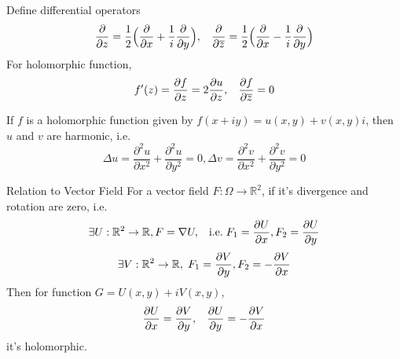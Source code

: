 \documentclass{beamer}
\begin{document}
\begin{frame}
\begin{block}{}
Define differential operators
$$\dfrac{\partial }{\partial z}=\dfrac{1}{2}\Big(\dfrac{\partial }{\partial x}+\dfrac{1}{i}\dfrac{\partial }{\partial y}\Big),\hspace{3mm}\dfrac{\partial }{\partial \overline{z}}=\dfrac{1}{2}\Big(\dfrac{\partial }{\partial x}-\dfrac{1}{i}\dfrac{\partial }{\partial y}\Big)$$
For holomorphic function,
$$f'(z)=\dfrac{\partial f}{\partial z}=2\dfrac{\partial u}{\partial z},\hspace{3mm} \dfrac{\partial f}{\partial \overline{z}}=0$$

If $f$ is a holomorphic function given by $f(x + iy) = u(x, y) + v(x,y)i$, then $u$ and $v$ are harmonic, i.e.
$$\Delta u=\dfrac{\partial^2u}{\partial x^2}+\dfrac{\partial^2u}{\partial y^2}=0,\Delta v=\dfrac{\partial^2v}{\partial x^2}+\dfrac{\partial^2v}{\partial y^2}=0$$
\end{block}
\end{frame}

\begin{frame}
\begin{block}{Relation to Vector Field}
For a vector field $F:\Omega\rightarrow\mathbb{R}^2$, if it's divergence and rotation are zero, i.e.
$$\exists U:\mathbb{R}^2\rightarrow\mathbb{R},F=\nabla U, \hspace{3mm}\text{i.e.}\hspace{1mm}F_1=\dfrac{\partial U}{\partial x},F_2=\dfrac{\partial U}{\partial y}$$
$$\exists V:\mathbb{R}^2\rightarrow\mathbb{R},\hspace{1mm}F_1=\dfrac{\partial V}{\partial y},F_2=-\dfrac{\partial V}{\partial x}$$
Then for function $G=U(x,y)+iV(x,y)$,
$$\dfrac{\partial U}{\partial x}=\dfrac{\partial V}{\partial y},\hspace{3mm}\dfrac{\partial U}{\partial y}=-\dfrac{\partial V}{\partial x}$$
it's holomorphic.
\end{block}
\end{frame}
\end{document}
